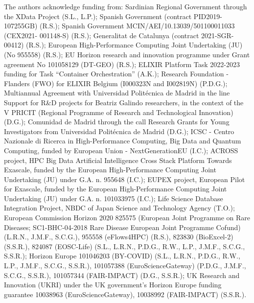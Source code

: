 \documentclass[10pt,letterpaper]{article}
\begin{document}
\iffalse
The authors acknowledge funding from: 
  Sardinian Regional Government through the XData Project (S.L., L.P.);
  Spanish Government (contract PID2019-107255GB) (R.S.);
  Spanish Government MCIN/AEI/10.13039/501100011033 (CEX2021- 001148-S) (R.S.);
  Generalitat de Catalunya (contract 2021-SGR-00412) (R.S.);
  European High-Performance Computing Joint Undertaking (JU) (No 955558) (R.S.);
  EU Horizon research and innovation programme under Grant agreement No 101058129 (DT-GEO) (R.S.);
  ELIXIR Platform Task 2022-2023 funding for Task ``Container
  Orchestration'' (A.K.);
  Research Foundation - Flanders (FWO) for ELIXIR Belgium (I000323N and I002819N) (P.D.G.);
  Multiannual Agreement with Universidad Politécnica de Madrid in the line Support for R\&D projects for Beatriz Galindo researchers, in the context of the V PRICIT (Regional Programme of Research and Technological Innovation) (D.G.);
  Comunidad de Madrid through the call Research Grants for Young Investigators from Universidad Politécnica de Madrid (D.G.);
  ICSC - Centro Nazionale di Ricerca in High-Performance Computing, Big Data and Quantum Computing, funded by European Union - NextGenerationEU (I.C.);
  ACROSS project, HPC Big Data Artificial Intelligence Cross Stack Platform Towards Exascale, funded by the European High-Performance Computing Joint Undertaking (JU) under G.A. n. 955648 (I.C.);
  EUPEX project, European Pilot for Exascale, funded by the European High-Performance Computing Joint Undertaking (JU) under G.A. n. 101033975 (I.C.);
  Life Science Database Integration Project, NBDC of Japan Science and
  Technology Agency (T.O.);
  European Commission Horizon 2020 
  825575 (European Joint Programme on Rare Diseases; SC1-BHC-04-2018 Rare Disease European Joint Programme Cofund) (L.R.N., J.M.F., S.C.G.),
  955558 (eFlows4HPC) (R.S.),
  823830
  (BioExcel-2) (S.S.R.), 
  824087
  (EOSC-Life) (S.L., L.R.N., P.D.G., R.W., L.P., J.M.F., S.C.G., S.S.R.);
  Horizon Europe 
  101046203 (BY-COVID) (S.L., L.R.N., P.D.G., R.W., L.P., J.M.F., S.C.G., S.S.R.),
  101057388 (EuroScienceGateway) (P.D.G., J.M.F., S.C.G., S.S.R.),
  101057344 (FAIR-IMPACT) (D.G., S.S.R.);
  UK Research and Innovation (UKRI) under the UK government's Horizon
  Europe funding guarantee 
  10038963 (EuroScienceGateway), 
  10038992 (FAIR-IMPACT) (S.S.R.).
\end{document}
